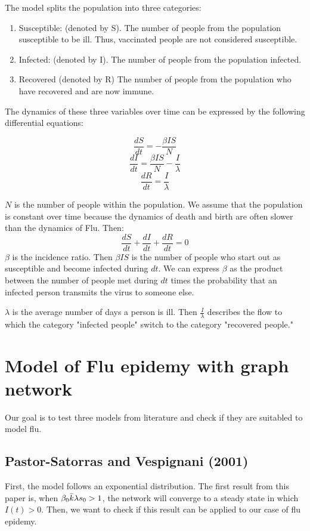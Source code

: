 The model splits the population into three categories: 
\begin{enumerate}
    \item Susceptible: (denoted by S). The number of people from the population susceptible to be ill. Thus, vaccinated people are not considered susceptible.
    \item Infected: (denoted by I). The number of people from the population infected.
    \item Recovered (denoted by R) The number of people from the population who have recovered and are now immune.
    
\end{enumerate}

The dynamics of these three variables over time can be expressed by the following differential equations:

$${\frac  {dS}{dt}}=-{\frac  {\beta IS}{N}}$$
$${\frac  {dI}{dt}}={\frac  {\beta IS}{N}}-\frac{I}{\lambda}$$
$${\frac  {dR}{dt}}=\frac{I}{\lambda}$$

$N$ is the number of people within the population. We assume that the population is constant over time because the dynamics of death and birth are often slower than the dynamics of Flu. Then:
$${\frac  {dS}{dt}}+{\frac  {dI}{dt}}+{\frac  {dR}{dt}}=0$$
$\beta$ is the incidence ratio. Then $\beta I S$ is the number of people who start out as susceptible and become infected during $dt$. We can express $\beta$ as the product between the number of people met during $dt$ times the probability that an infected person transmits the virus to someone else.


$\lambda$ is the average number of days a person is ill. Then $\frac{I}{\lambda}$ describes the flow to which the category "infected people" switch to the category "recovered people."


\section{Model of Flu epidemy with graph network}

Our goal is to test three models from literature and check if they are suitabled to model flu.

\subsection{Pastor-Satorras and Vespignani (2001) \cite{PhysRevLett.86.3200}}

First, the model follows an exponential distribution.
The first result from this paper is, when $\beta_{0} \Bar{k} \lambda s_0>1$, the network will converge to a steady state in which $I(t) > 0$. Then, we want to check if this result can be applied to our case of flu epidemy.


